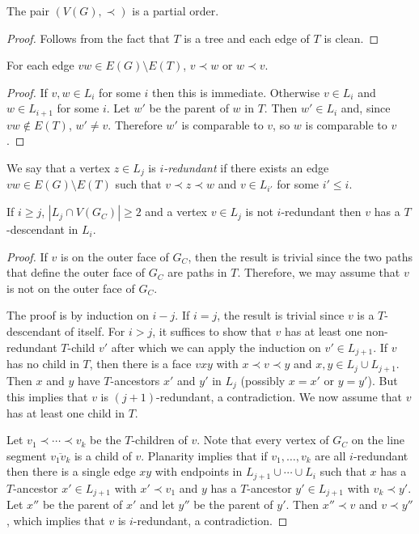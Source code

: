 \documentclass{patmorin}
\newcommand{\defin}[1]{\emph{\textcolor{brightmaroon}{#1}}}
\begin{document}
\begin{clm}\label{partial_order}
  The pair $(V(G),\prec)$ is a partial order.
\end{clm}

\begin{proof}
  Follows from the fact that $T$ is a tree and each edge of $T$ is clean.
\end{proof}


\begin{clm}
  For each edge $vw\in E(G)\setminus E(T)$, $v\prec w$ or $w\prec v$.
\end{clm}

\begin{proof}
  If $v,w\in L_i$ for some $i$ then this is immediate. Otherwise $v\in L_i$ and $w\in L_{i+1}$ for some $i$. Let $w'$ be the parent of $w$ in $T$.  Then $w'\in L_i$ and, since $vw\not\in E(T)$, $w'\neq v$.  Therefore $w'$ is comparable to $v$, so $w$ is comparable to $v$.
\end{proof}


We say that a vertex $z\in L_j$ is \defin{$i$-redundant} if there exists an edge $vw\in E(G)\setminus E(T)$ such that $v\prec z\prec w$ and $v\in L_{i'}$ for some $i'\le i$.

\begin{clm}\label{has_descendant}
  If $i\ge j$, $|L_j\cap V(G_C)|\ge 2$ and a vertex $v\in L_j$ is not $i$-redundant then $v$ has a $T$-descendant in $L_i$.
\end{clm}

\begin{proof}
  If $v$ is on the outer face of $G_C$, then the result is trivial since the two paths that define the outer face of $G_C$ are paths in $T$.  Therefore, we may assume that $v$ is not on the outer face of $G_C$.

  The proof is by induction on $i-j$.
  If $i=j$, the result is trivial since $v$ is a $T$-descendant of itself. For $i>j$, it suffices to show that $v$ has at least one non-redundant $T$-child $v'$ after which we can apply the induction on $v'\in L_{j+1}$.  If $v$ has no child in $T$, then there is a face $vxy$ with $x\prec v\prec y$ and $x,y\in L_{j}\cup L_{j+1}$. Then $x$ and $y$ have $T$-ancestors $x'$ and $y'$ in $L_j$ (possibly $x=x'$ or $y=y'$). But this implies that $v$ is $(j+1)$-redundant, a contradiction. We now assume that $v$ has at least one child in $T$.

  Let $v_1\prec\cdots\prec v_k$ be the $T$-children of $v$.  Note that every vertex of $G_C$ on the line segment $\overline{v_1v_k}$ is a child of $v$.  Planarity implies that if $v_1,\ldots,v_k$ are all $i$-redundant then there is a single edge $xy$ with endpoints in $L_{j+1}\cup\cdots\cup L_i$ such that $x$ has a $T$-ancestor $x'\in L_{j+1}$ with $x'\prec v_1$ and $y$ has a $T$-ancestor $y'\in L_{j+1}$ with $v_k\prec y'$. Let $x''$ be the parent of $x'$ and let $y''$ be the parent of $y'$.  Then $x''\prec v$ and $v\prec y''$, which implies that $v$ is $i$-redundant, a contradiction.
\end{proof}
\end{document}
